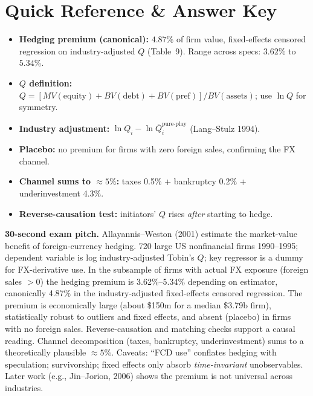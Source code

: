\documentclass[11pt]{article}
\begin{document}
\section*{Quick Reference \& Answer Key}
\begin{answerbox}
\begin{itemize}
\item \textbf{Hedging premium (canonical):} $4.87\%$ of firm value, fixed-effects censored regression on industry-adjusted $Q$ (Table~9). Range across specs: $3.62\%$ to $5.34\%$.
\item \textbf{$Q$ definition:} $Q=[MV(\text{equity})+BV(\text{debt})+BV(\text{pref})]/BV(\text{assets})$; use $\ln Q$ for symmetry.
\item \textbf{Industry adjustment:} $\ln Q_i - \ln \overline Q^{\text{pure-play}}_i$ (Lang--Stulz 1994).
\item \textbf{Placebo:} no premium for firms with zero foreign sales, confirming the FX channel.
\item \textbf{Channel sums to $\approx 5\%$:} taxes 0.5\% + bankruptcy 0.2\% + underinvestment 4.3\%.
\item \textbf{Reverse-causation test:} initiators' $Q$ rises \emph{after} starting to hedge.
\end{itemize}
\end{answerbox}

\begin{keybox}
\textbf{30-second exam pitch.} Allayannis--Weston (2001) estimate the market-value benefit of foreign-currency hedging. 720 large US nonfinancial firms 1990--1995; dependent variable is log industry-adjusted Tobin's $Q$; key regressor is a dummy for FX-derivative use. In the subsample of firms with actual FX exposure (foreign sales $>0$) the hedging premium is 3.62\%--5.34\% depending on estimator, canonically 4.87\% in the industry-adjusted fixed-effects censored regression. The premium is economically large (about \$150m for a median \$3.79b firm), statistically robust to outliers and fixed effects, and absent (placebo) in firms with no foreign sales. Reverse-causation and matching checks support a causal reading. Channel decomposition (taxes, bankruptcy, underinvestment) sums to a theoretically plausible $\approx 5\%$. Caveats: ``FCD use'' conflates hedging with speculation; survivorship; fixed effects only absorb \emph{time-invariant} unobservables. Later work (e.g., Jin--Jorion, 2006) shows the premium is not universal across industries.
\end{keybox}
\end{document}
